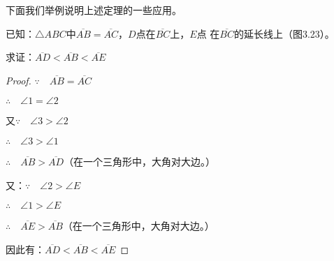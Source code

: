 下面我们举例说明上述定理的一些应用。


\begin{example}
    已知：$\triangle ABC$中$\overline{AB}=\overline{AC}$，$D$点在$\overline{BC}$上，$E$点
在$\overline{BC}$的延长线上（图3.23）。

求证：$\overline{AD}<\overline{AB}<\overline{AE}$
\end{example}

\begin{figure}
    \begin{minipage}[t]{0.48\linewidth}
    \centering
\begin{tikzpicture}[>=latex, scale=1]
    \end{tikzpicture}
    \caption{}
    \end{minipage}
    \begin{minipage}[t]{0.48\linewidth}
    \centering
    \begin{tikzpicture}[>=latex, scale=1.2]
    \end{tikzpicture}
    \caption{}
    \end{minipage}
    \end{figure}

\begin{proof}
$\because\quad \overline{AB}=\overline{AC}$

$\therefore\quad \angle 1=\angle 2$

又$\because\quad \angle 3>\angle 2$

$\therefore\quad \angle 3>\angle 1$

$\therefore\quad \overline{AB}>\overline{AD}$（在一个三角形中，大角对大边。）

又：$\because\quad \angle 2>\angle E$

$\therefore\quad \angle 1>\angle E$

$\therefore\quad \overline{AE}>\overline{AB}$（在一个三角形中，大角对大边。）

因此有：$\overline{AD}<\overline{AB}<\overline{AE}$
\end{proof}



